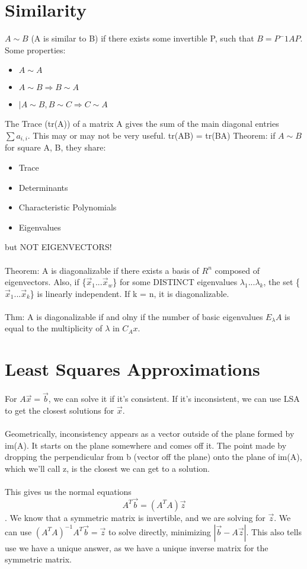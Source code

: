 \documentclass[10pt, twocolumn]{report}
\begin{document}
\section{Similarity}
$A \sim B$ (A is similar to B) if there exists some invertible P, such that $B = P^-1 A P$. Some properties:
\begin{itemize}
    \item $A \sim A$
    \item $A \sim B \Rightarrow B \sim A$
    \item $|A \sim B, B \sim C \Rightarrow C \sim A$
\end{itemize}
The Trace (tr(A)) of a matrix A gives the sum of the main diagonal entries $\sum a_{i,i}$. This may or may not be very useful. tr(AB) = tr(BA) \newpage
Theorem: if $A \sim B$ for square A, B, they share:
\begin{itemize}
    \item Trace
    \item Determinants
    \item Characteristic Polynomials
    \item Eigenvalues
\end{itemize}
but NOT EIGENVECTORS! \\\\
Theorem: A is diagonalizable if there exists a basis of $R^n$ composed of eigenvectors. Also, if \{$\vec x_1 ... \vec x_w$\} for some DISTINCT eigenvalues $\lambda_1 ... \lambda_k$, the set \{$\vec x_1 ... \vec x_k$\} is linearly independent. If k = n, it is diagonalizable.  \\\\
Thm: A is diagonalizable if and olny if the number of basic eigenvalues $E_\lambda A$ is equal to the multiplicity of $\lambda$ in $C_A x$.
\section{Least Squares Approximations}
For $A\vec x = \vec b$, we can solve it if it's consistent. If it's inconsistent, we can use LSA to get the closest solutions for $\vec x$. \\\\ Geometrically, inconsistency appears as a vector outside of the plane formed by im(A). It starts on the plane somewhere and comes off it. The point made by dropping the perpendicular from b (vector off the plane) onto the plane of im(A), which we'll call z, is the closest we can get to a solution. \\\\This gives us the normal equations $$A^T \vec b = (A^TA)\vec z$$. We know that a symmetric matrix is invertible, and we are solving for $\vec z$. We can use $(A^TA)^{-1}A^T \vec b = \vec z$ to solve directly, minimizing $|\vec b - A\vec z|$. This also tells use we have a unique answer, as we have a unique inverse matrix for the symmetric matrix.
\end{document}
